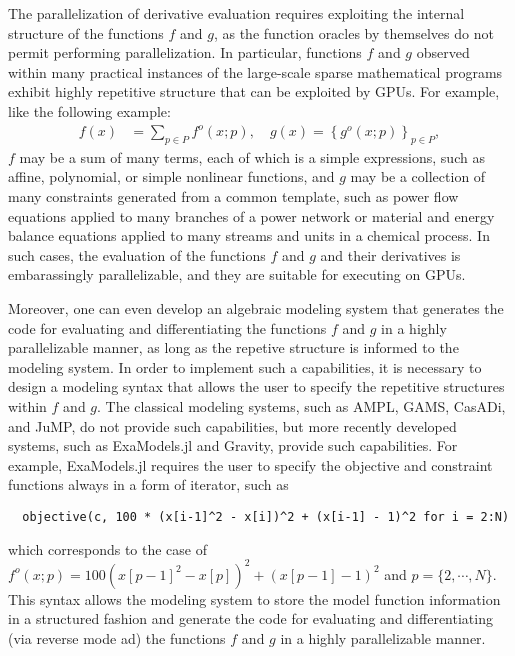 \documentclass{article}
\begin{document}
The parallelization of derivative evaluation requires exploiting the internal structure of the functions $f$ and $g$, as the function oracles by themselves do not permit performing parallelization.
In particular, functions $f$ and $g$ observed within many practical instances of the large-scale sparse mathematical programs exhibit highly repetitive structure that can be exploited by GPUs.
For example, like the following example:
\begin{align*}
  f(x) &= \sum_{p\in P} f^o(x; p), \quad g(x) = \left\{g^o(x; p)\right\}_{p\in P},
\end{align*}
$f$ may be a sum of many terms, each of which is a simple expressions, such as affine, polynomial, or simple nonlinear functions, and $g$ may be a collection of many constraints generated from a common template, such as power flow equations applied to many branches of a power network or material and energy balance equations applied to many streams and units in a chemical process. In such cases, the evaluation of the functions $f$ and $g$ and their derivatives is embarassingly parallelizable, and they are suitable for executing on GPUs.

Moreover, one can even develop an algebraic modeling system that generates the code for evaluating and differentiating the functions $f$ and $g$ in a highly parallelizable manner, as long as the repetive structure is informed to the modeling system. In order to implement such a capabilities, it is necessary to design a modeling syntax that allows the user to specify the repetitive structures within $f$ and $g$. The classical modeling systems, such as AMPL, GAMS, CasADi, and JuMP, do not provide such capabilities, but more recently developed systems, such as ExaModels.jl and Gravity, provide such capabilities. For example, ExaModels.jl requires the user to specify the objective and constraint functions always in a form of iterator, such as
\begin{lstlisting}
  objective(c, 100 * (x[i-1]^2 - x[i])^2 + (x[i-1] - 1)^2 for i = 2:N)
\end{lstlisting}
which corresponds to the case of $f^o(x; p) = 100(x[p-1]^2 - x[p])^2 + (x[p-1]-1)^2$ and $p=\{2,\cdots,N\}$.
This syntax allows the modeling system to store the model function information in a structured fashion and generate the code for evaluating and differentiating (via reverse mode \gls*{ad}) the functions $f$ and $g$ in a highly parallelizable manner.
\end{document}
